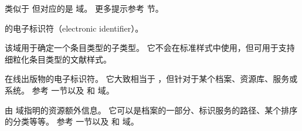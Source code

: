 \begin{fieldlist}

类似于  但对应的是  域。
更多提示参考  节。




 的电子标识符（electronic identifier）。




该域用于确定一个条目类型的子类型。
它不会在标准样式中使用，但可用于支持细粒化条目类型的文献样式。




在线出版物的电子标识符。
它大致相当于 ，但针对于某个档案、资源库、服务或系统。
参考  一节以及  和  域。




由  域指明的资源额外信息。
它可以是档案的一部分、标识服务的路径、某个排序的分类等等。
参考  一节以及  和  域。




\end{fieldlist}
